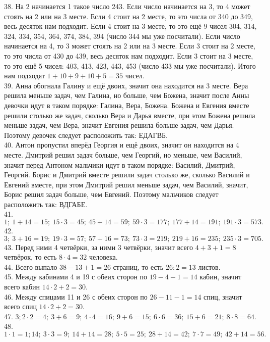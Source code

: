 38. На 2 начинается 1 такое число 243. Если число начинается на 3, то 4 может стоять на 2 или на 3 месте. Если 4 стоит на 2 месте, то это числа от 340 до 349, весь десяток нам подходит. Если 4 стоит на 3 месте, то это ещё 9 чисел 304, 314, 324, 334, 354, 364, 374, 384, 394 (число 344 мы уже посчитали). Если число начинается на 4, то 3 может стоять на 2 или на 3 месте. Если 3 стоит на 2 месте, то это числа от 430 до 439, весь десяток нам подходит. Если 3 стоит на 3 месте, то это ещё 5 чисел: 403, 413, 423, 443, 453 (число 433 мы уже посчитали). Итого нам подходят $1+10+9+10+5=35$ чисел.\\
39. Анна обогнала Галину и ещё двоих, значит она находится на 3 месте. Вера решила меньше задач, чем Галина, но больше, чем Божена, значит после Анны девочки идут в таком порядке: Галина, Вера, Божена. Божена и Евгения вместе решили столько же задач, сколько Вера и Дарья вместе, при этом Божена решила меньше задач, чем Вера, значит Евгения решила больше задач, чем Дарья. Поэтому девочек следует расположить так: ЕДАГВБ.\\
40. Антон пропустил вперёд Георгия и ещё двоих, значит он находится на 4 месте. Дмитрий решил задач больше, чем Георгий, но меньше, чем Василий, значит перед Антоном мальчики идут в таком порядке: Василий, Дмитрий, Георгий. Борис и Дмитрий вместе решили задач столько же, сколько Василий и Евгений вместе, при этом Дмитрий решил меньше задач, чем Василий, значит, Борис решил задач больше, чем Евгений. Поэтому мальчиков следует расположить так: ВДГАБЕ.\\
41. $1;\ 1+14=15;\ 15\cdot3=45;\ 45+14=59;\ 59\cdot3=177;\ 177+14=191;\ 191\cdot3=573.$\\
42. $3;\ 3+16=19;\ 19\cdot3=57;\ 57+16=73;\ 73\cdot3=219;\ 219+16=235;\ 235\cdot3=705.$\\
43. Перед ними 4 четвёрки, за ними 3 четвёрки, значит всего $4+3+1=8$ четвёрок, то есть $8\cdot4=32$ человека.\\
44. Всего выпало $38-13+1=26$ страниц, то есть $26:2=13$ листов.\\
45. Между кабинами 4 и 19 с обеих сторон по $19-4-1=14$ кабин, значит всего кабин $14\cdot2+2=30.$\\
46. Между спицами 11 и 26 с обеих сторон по $26-11-1=14$ спиц, значит всего спиц $14\cdot2+2=30.$\\
47. $3; 2\cdot2=4;\ 3+6=9;\ 4\cdot4=16;\ 9+6=15;\ 6\cdot6=36;\ 15+6=21;\ 8\cdot8=64.$\\
48. $1\cdot1=1; 14;\ 3\cdot3=9;\ 14+14=28;\ 5\cdot5=25;\ 28+14=42;\ 7\cdot7=49;\ 42+14=56.$\\
